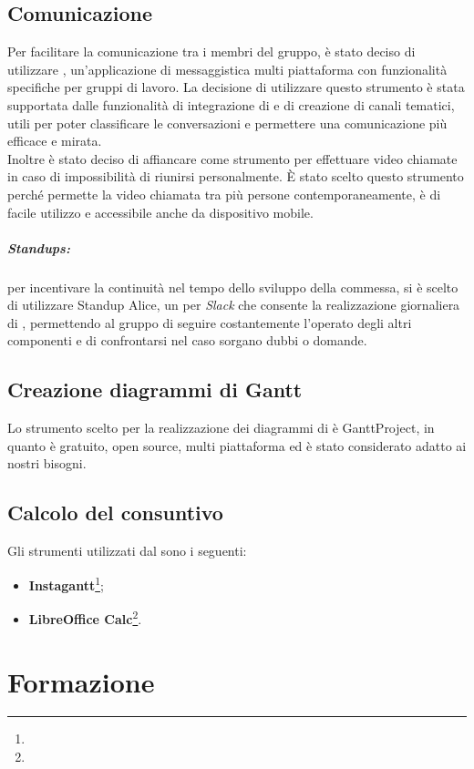 \documentclass[NormeDiProgetto.tex]{subfiles}
\begin{document}
	\subsection{Comunicazione}
	Per facilitare la comunicazione tra i membri del gruppo, è stato deciso di utilizzare , un'applicazione di messaggistica multi piattaforma con funzionalità specifiche per gruppi di lavoro. La decisione di utilizzare questo strumento è stata supportata dalle funzionalità di integrazione di  e di creazione di canali tematici, utili per poter classificare le conversazioni e permettere una comunicazione più efficace e mirata.\\
	Inoltre è stato deciso di affiancare  come strumento per effettuare video chiamate in caso di impossibilità di riunirsi personalmente. \`{E} stato scelto questo strumento perché permette la video chiamata tra più persone contemporaneamente, è di facile utilizzo e accessibile anche da dispositivo mobile.\\

	\subparagraph{Standups:} per incentivare la continuità nel tempo dello sviluppo della commessa, si è scelto di utilizzare Standup Alice, un  per \emph{Slack} che consente la realizzazione giornaliera di , permettendo al gruppo di seguire costantemente l'operato degli altri componenti e di confrontarsi nel caso sorgano dubbi o domande.

	\subsection{Creazione diagrammi di Gantt}
	Lo strumento scelto per	la realizzazione dei diagrammi di  è GanttProject, in quanto è gratuito, open source, multi piattaforma ed è stato considerato adatto ai nostri bisogni.
	\subsection{Calcolo del consuntivo}
	Gli strumenti utilizzati dal \respdiprog sono i seguenti:
	\begin{itemize}
		\item \textbf{Instagantt}\footnote{};
		\item \textbf{LibreOffice Calc}\footnote{}.
	\end{itemize}
	
	\section{Formazione}
\end{document}
